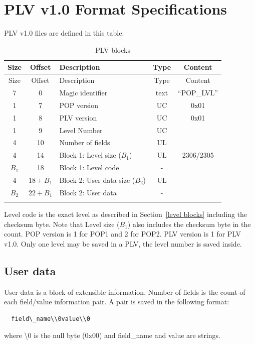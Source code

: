 \documentclass{article}
\begin{document}
\pagebreak[3]
\section{PLV v1.0 Format Specifications}

 PLV v1.0 files are defined in this table:

\begin{longtable}{cclcc}
\hline
   Size&Offset&Description                 & Type  & Content \\
\hline
\endfirsthead
\hline
   Size&Offset&Description                 & Type  & Content \\
\hline
\endhead
\hline
      7     & 0& Magic identifier            & text  & ``POP\_LVL'' \\
      1     & 7& POP version                 & UC    & 0x01 \\
      1     & 8& PLV version                 & UC    & 0x01 \\
      1     & 9& Level Number                & UC \\
      4    & 10& Number of fields            & UL \\
      4    & 14& Block 1: Level size ($B_1$)    & UL    & 2306/2305 \\
     $B_1$    & 18& Block 1: Level code         & - \\
      4 & $18+B_1$& Block 2: User data size ($B_2$)& UL \\
     $B_2$ & $22+B_1$& Block 2: User data          & - \\
\hline
\caption{PLV blocks}
\label{palettes table}
\end{longtable}

 Level code is the exact level as described in Section~\ref{level blocks} including the checksum
 byte. Note that Level size ($B_1$) also includes the checksum byte in the
 count.
 POP version is 1 for POP1 and 2 for POP2.
 PLV version is 1 for PLV v1.0.
 Only one level may be saved in a PLV, the level number is saved inside.

\subsection{User data}

 User data is a block of extensible information, Number of fields is the
 count of each field/value information pair. A pair is saved in the
 following format:
\begin{verbatim}
  field\_name\\0value\\0
\end{verbatim}
 where \textbackslash0 is the null byte (0x00) and field\_name and value are strings.
\end{document}
